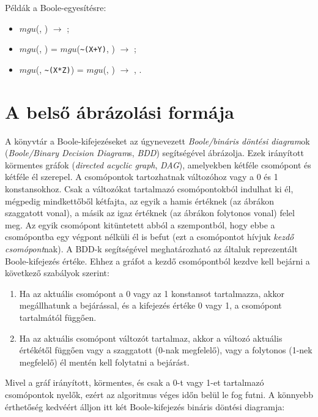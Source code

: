 Példák a Boole-egyesítésre:

\begin{itemize}
\item $mgu$(, ) $\longrightarrow$ ;
\item $mgu$(, ) = $mgu$(\verb'~(X+Y)', )
$\longrightarrow$ ;
\item $mgu$(, \verb'~(X*Z)') = $mgu$(, )
$\longrightarrow$ , .
\end{itemize}

\section{A \clpb belső ábrázolási formája}

A \clpb könyvtár a Boole-kifejezéseket az úgynevezett \emph{Boole/bináris
döntési diagram}ok (\emph{Boole/Binary Decision Diagram}s, \emph{BDD})
segítségével ábrázolja. Ezek irányított körmentes gráfok (\emph{directed
acyclic graph}, \emph{DAG}), amelyekben kétféle csomópont és kétféle él
szerepel. A csomópontok tartozhatnak változóhoz vagy a 0 és 1 konstansokhoz.
Csak a változókat tartalmazó csomópontokból indulhat ki él, mégpedig
mindkettőből kétfajta, az egyik a hamis értéknek (az ábrákon szaggatott vonal),
a másik az igaz értéknek (az ábrákon folytonos vonal) felel meg. Az egyik
csomópont kitüntetett abból a szempontból, hogy ebbe a csomópontba egy
végpont nélküli él is befut (ezt a csomópontot hívjuk \emph{kezdő csomópont}nak).
A BDD-k segítségével meghatározható az általuk reprezentált Boole-kifejezés
értéke. Ehhez a gráfot a kezdő csomópontból kezdve kell bejárni a
következő szabályok szerint:

\begin{enumerate}
\item Ha az aktuális csomópont a 0 vagy az 1 konstansot tartalmazza, akkor
megállhatunk a bejárással, és a kifejezés értéke 0 vagy 1, a csomópont
tartalmától függően.
\item Ha az aktuális csomópont változót tartalmaz, akkor a változó aktuális
értékétől függően vagy a szaggatott (0-nak megfelelő), vagy a folytonos
(1-nek megfelelő) él mentén kell folytatni a bejárást.
\end{enumerate}

Mivel a gráf irányított, körmentes, és csak a 0-t vagy 1-et tartalmazó
csomópontok nyelők, ezért az algoritmus véges időn belül le fog futni.
A könnyebb érthetőség kedvéért álljon itt két Boole-kifejezés bináris döntési
diagramja:

